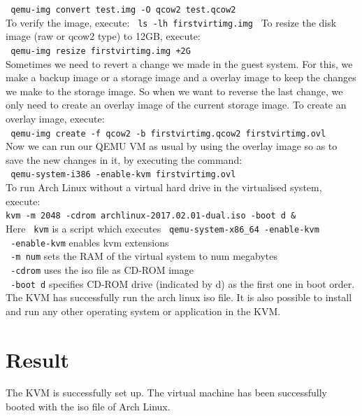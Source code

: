 \documentclass[12pt,a4paper]{article}
\begin{document}
\newline
\texttt{\ qemu-img convert test.img -O qcow2 test.qcow2}\\
\newline
To verify the image, execute:
\newline
\texttt{\ ls -lh firstvirtimg.img }
\newline
To resize the disk image (raw or qcow2 type) to 12GB, execute:\\
\newline
\texttt{\ qemu-img resize firstvirtimg.img +2G }\\
\newline
Sometimes we need to revert a change we made in the guest system. For this, we make a backup image or a storage image and a overlay image to keep the changes we make to the storage image. So when we want to reverse the last change, we only need to create an overlay image of the current storage image. To create an overlay image, execute:\\
\newline
\texttt{\ qemu-img create -f qcow2 -b firstvirtimg.qcow2 firstvirtimg.ovl}\\
Now we can run our QEMU VM as usual by using the overlay image so as to save the new changes in it, by executing the command:\\
\newline
\texttt{\ qemu-system-i386 -enable-kvm firstvirtimg.ovl}\\
\newline
To run Arch Linux without a virtual hard drive in the virtualised system, execute:\\
\texttt{kvm -m 2048 -cdrom archlinux-2017.02.01-dual.iso -boot d  &}\\
\newline
Here \texttt{\ kvm} is a script which executes \texttt{\ qemu-system-x86\texttt{\_}64 -enable-kvm}\\
\texttt{\ -enable-kvm} enables kvm extensions\\
\texttt{\ -m num} sets the RAM of the virtual system to num megabytes\\
\texttt{\ -cdrom} uses the iso file as CD-ROM image\\
\texttt{\ -boot d} specifies CD-ROM drive (indicated by d) as the first one in boot order.\\
\newline
The KVM has successfully run the arch linux iso file. It is also possible to install and run any other operating system or application in the KVM.\\
\newline
\section{Result}
The KVM is successfully set up. The virtual machine has been successfully booted with the iso file of Arch Linux.
\end{document}
